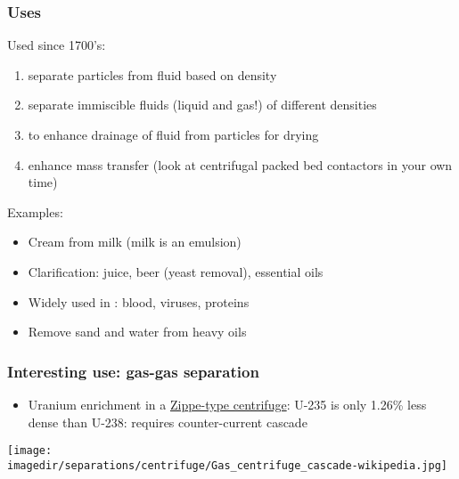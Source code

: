 \begin{frame}\frametitle{Uses}
	Used since 1700's:
	\begin{enumerate}
		\item	separate particles from fluid based on density
		\item	separate immiscible fluids (liquid and gas!) of different densities
		\item	to enhance drainage of fluid from particles for drying
		\item	enhance mass transfer {\scriptsize (look at centrifugal packed bed contactors in your own time)}
	\end{enumerate}
	
	\vspace{12pt}
	Examples:
	\begin{itemize}
		\item	Cream from milk (milk is an emulsion)
		\item	Clarification: juice, beer (yeast removal), essential oils
		\item	Widely used in {\color{myGreen}{bioseparations}}: blood, viruses, proteins
		\item	Remove sand and water from heavy oils
	\end{itemize}
\end{frame}

\begin{frame}\frametitle{Interesting use: gas-gas separation}
	\begin{itemize}
		\item	\small Uranium enrichment in a \href{http://en.wikipedia.org/wiki/Zippe-type_centrifuge}{Zippe-type centrifuge}:  U-235 is only 1.26\% less dense than U-238: requires counter-current cascade
	\end{itemize}
	\begin{center}
		\texttt{[image: \\imagedir/separations/centrifuge/Gas\_centrifuge\_cascade-wikipedia.jpg]}
	\end{center}
	\vspace{-12pt}
\end{frame}

